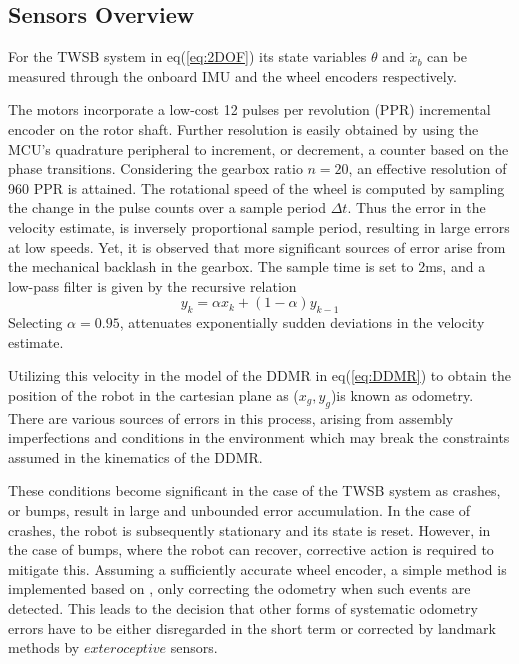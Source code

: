     \subsection{Sensors Overview}
        For the TWSB system in eq(\ref{eq:2DOF}) its state variables $\theta$ and $\dot x_b$ can be measured through the onboard IMU 
        and the wheel encoders respectively. 
            
        The motors incorporate a low-cost 12 pulses per revolution (PPR) incremental encoder on the rotor shaft. 
        Further resolution is easily obtained by using the MCU's quadrature 
        peripheral to increment, or decrement, a counter based on the phase transitions.
        Considering the gearbox ratio $n=20$, an effective resolution of 960 PPR is attained.
        The rotational speed of the wheel is computed by sampling the change in the pulse counts
        over a sample period $\Delta t$. Thus the error in the velocity estimate, 
        is inversely proportional sample period, resulting in large errors at low speeds.
        Yet, it is observed that more significant sources of error arise from the mechanical backlash in the gearbox.
        The sample time is set to 2ms, and a low-pass filter is given by the recursive relation
            \begin{equation}
        y_k = \alpha x_k + (1-\alpha)y_{k-1}
                \label{eq:lpf}
            \end{equation}
        Selecting $\alpha = 0.95$, attenuates exponentially sudden deviations in the velocity estimate.

        Utilizing this velocity in the model of the DDMR in eq(\ref{eq:DDMR}) to obtain the
        position of the robot in the cartesian plane as ($x_g,y_g$)is known as odometry.
        There are various sources of errors in 
        this process, arising from assembly imperfections and conditions in 
        the environment which may break the constraints assumed in the kinematics of the DDMR.
            
        These conditions become significant in the case of the TWSB system as crashes, or bumps, result in large 
        and unbounded error accumulation. In the case of crashes, the robot is subsequently stationary 
        and its state is reset. However, in the case of bumps, where the robot can recover, corrective 
        action is required to mitigate this. Assuming a sufficiently accurate wheel encoder, a simple method is 
        implemented based on \cite{Gyrodometry}, only correcting 
        the odometry when such events are detected.  
        This leads to the decision that other forms of systematic odometry errors have to be 
        either disregarded in the short term or corrected by landmark methods by $exteroceptive$ sensors. 

